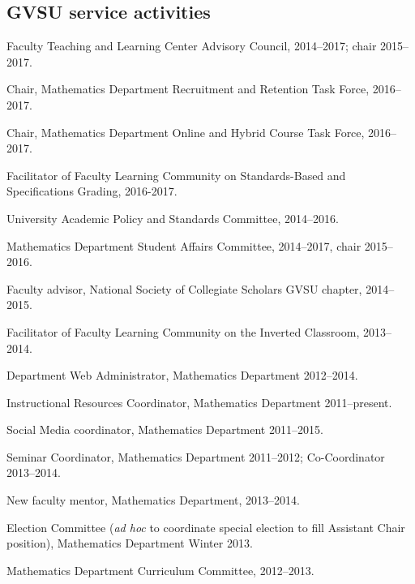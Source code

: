 \documentclass[letterpaper]{article}
\renewenvironment{itemize}{
  \begin{list}{}{
    \setlength{\leftmargin}{1.5em}
	\setlength{\itemsep}{0in}
  }
}{
  \end{list}
}
\begin{document}
\subsection*{GVSU service activities}
\begin{itemize}
	\item Faculty Teaching and Learning Center Advisory Council, 2014--2017; chair 2015--2017. 
	\item Chair, Mathematics Department Recruitment and Retention Task Force, 2016--2017.
	\item Chair, Mathematics Department Online and Hybrid Course Task Force, 2016--2017. 
	\item Facilitator of Faculty Learning Community on Standards-Based and Specifications Grading, 2016-2017. 
	\item University Academic Policy and Standards Committee, 2014--2016. 
	\item Mathematics Department Student Affairs Committee, 2014--2017, chair 2015--2016. 
	\item Faculty advisor, National Society of Collegiate Scholars GVSU chapter, 2014--2015.
	\item Facilitator of Faculty Learning Community on the Inverted Classroom, 2013--2014. 
	\item Department Web Administrator, Mathematics Department 2012--2014.  
	\item Instructional Resources Coordinator, Mathematics Department 2011--present. 
	\item Social Media coordinator, Mathematics Department 2011--2015.
	\item Seminar Coordinator, Mathematics Department 2011--2012; Co-Coordinator 2013--2014. 
	\item New faculty mentor, Mathematics Department, 2013--2014. 
	\item Election Committee (\emph{ad hoc} to coordinate special election to fill Assistant Chair position), Mathematics Department Winter 2013. 
	\item Mathematics Department Curriculum Committee, 2012--2013. 
\end{itemize}
\end{document}

